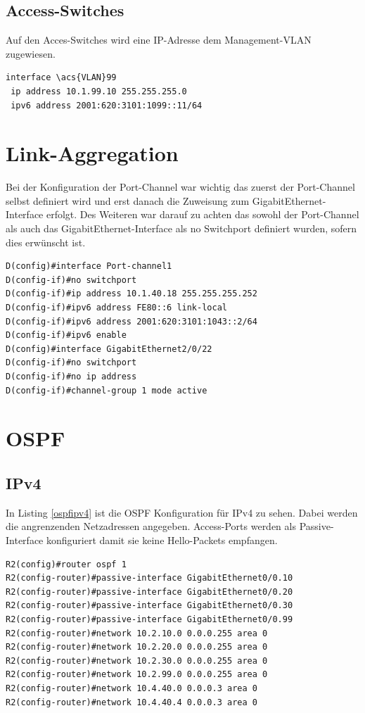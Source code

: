 \documentclass[11pt,a4paper]{scrreprt}
\begin{document}
\subsection{Access-Switches}
Auf den Acces-Switches wird eine IP-Adresse dem Management-\acs{VLAN} zugewiesen.
\newline
\begin{lstlisting}[frame=single, captionpos=b,caption= Access-Switch IP-Konfiguration]
interface \acs{VLAN}99
 ip address 10.1.99.10 255.255.255.0
 ipv6 address 2001:620:3101:1099::11/64
\end{lstlisting}

\section{Link-Aggregation} \label{linkaggre}
Bei der Konfiguration der Port-Channel war wichtig das zuerst der Port-Channel selbst definiert wird und erst danach die Zuweisung zum GigabitEthernet-Interface erfolgt. Des Weiteren war darauf zu achten das sowohl der Port-Channel als auch das GigabitEthernet-Interface als no Switchport definiert wurden, sofern dies erwünscht ist.
\newline
\begin{lstlisting}[frame=single, captionpos=b,caption= Switch Grund Konfiguration]
D(config)#interface Port-channel1
D(config-if)#no switchport
D(config-if)#ip address 10.1.40.18 255.255.255.252
D(config-if)#ipv6 address FE80::6 link-local
D(config-if)#ipv6 address 2001:620:3101:1043::2/64
D(config-if)#ipv6 enable
D(config)#interface GigabitEthernet2/0/22
D(config-if)#no switchport
D(config-if)#no ip address
D(config-if)#channel-group 1 mode active
\end{lstlisting}

\section{OSPF}
\subsection{IPv4}
In Listing \ref{ospfipv4} ist die OSPF Konfiguration für IPv4 zu sehen. Dabei werden die angrenzenden Netzadressen angegeben. Access-Ports werden als Passive-Interface konfiguriert damit sie keine Hello-Packets empfangen.
\newline
\begin{lstlisting}[frame=single, captionpos=b,caption= OSPF IPv4, label=ospfipv4]
R2(config)#router ospf 1
R2(config-router)#passive-interface GigabitEthernet0/0.10
R2(config-router)#passive-interface GigabitEthernet0/0.20
R2(config-router)#passive-interface GigabitEthernet0/0.30
R2(config-router)#passive-interface GigabitEthernet0/0.99
R2(config-router)#network 10.2.10.0 0.0.0.255 area 0
R2(config-router)#network 10.2.20.0 0.0.0.255 area 0
R2(config-router)#network 10.2.30.0 0.0.0.255 area 0
R2(config-router)#network 10.2.99.0 0.0.0.255 area 0
R2(config-router)#network 10.4.40.0 0.0.0.3 area 0
R2(config-router)#network 10.4.40.4 0.0.0.3 area 0
\end{lstlisting}
\end{document}
